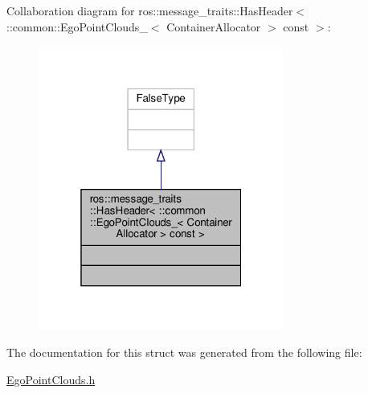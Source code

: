 Collaboration diagram for ros\+:\+:message\+\_\+traits\+:\+:Has\+Header$<$ \+:\+:common\+:\+:Ego\+Point\+Clouds\+\_\+$<$ Container\+Allocator $>$ const $>$\+:\nopagebreak
\begin{figure}[H]
\begin{center}
\leavevmode
\includegraphics[width=229pt]{d1/ddc/structros_1_1message__traits_1_1HasHeader_3_01_1_1common_1_1EgoPointClouds___3_01ContainerAlloca25e0f284609ad6e22eb9eb3ec0fde496}
\end{center}
\end{figure}


The documentation for this struct was generated from the following file\+:\begin{DoxyCompactItemize}
\item 
\hyperlink{EgoPointClouds_8h}{Ego\+Point\+Clouds.\+h}\end{DoxyCompactItemize}
